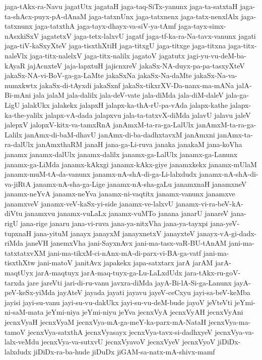 {jaga-tAkx-ra-Navu
jagatUtx
jagataH
jaga-taq-SiTx-yanunx
jaga-ta-satxtaH
jaga-ta-shAcx-puyx-pA-dAnaM
jaga-tatxnUnx
jaga-tatxnenx
jaga-tatx-nenxlAlx
jaga-tatxnunx
jaga-tatxthA
jaga-tayx-dhayx-va-siV-ya-tAmf
jaga-tayx-simx-nAsxkiSxV
jagatetxV
jaga-tetx-lalxvU
jagatf
jaga-tf-ka-ra-Na-tavx-vanunx
jagati
jaga-tiV-kaSxyXteV
jaga-tisxthXtiH
jaga-titxgU
jaga-titxge
jaga-titxna
jaga-titx-naleVlx
jaga-titx-nalelxV
jaga-titx-nalilx
jagatoV
jagatutx
jagi-yu-vu-deM-ba-kAyaR
jajAcnxteV
jaja-lapxtuH
jajicnxreV
jakaSx-NA-duyx-pa-pa-tasxyXteV
jakaSx-NA-vi-BoV-ga-ga-LaMte
jakaSxNa
jakaSx-Na-daMte
jakaSx-Na-va-numxkwtx
jakaSx-di-tAyxdi
jakaSxnf
jakaSx-tikxrXV-Da-nanx-ma-mANa
jalA-Bi-mAni
jala
jalaM
jala-dalilx
jala-deV-vate
jala-diMda
jala-diM-daleV
jala-ga-LigU
jalakUkx
jalakekx
jalapxH
jalapx-ka-thA-rU-pa-vAda
jalapx-kathe
jalapx-ka-the-yalilx
jalapx-vA-dada
jalapxvu
jala-ta-tatxvX-diMda
jalavU
jalavu
jaleV
jalepxV
jalopxV-kitx-va-tamxRnA
janAmxM-ta-ra-ga-LalUlx
janAmxM-ta-ra-ga-Lalilx
janAmx-di-baM-dhavU
janAmx-di-ba-dadhxtavxM
janAmxni
janAmx-ta-ra-dalUlx
janAmxthaRM
janaH
jana-ga-Li-ruva
janaka
janakaM
jana-koVha
janamx
janamx-dalUlx
janamx-dalilx
janamx-ga-LalUlx
janamx-ga-Lanunx
janamx-ga-LiMda
janamx-kAkxgi
janamx-kAkx-giye
janamxkekx
janamx-mUlaM
janamx-muM-tA-da-vanunx
janamx-nA-shA-di-ga-Li-lalxdudx
janamx-nA-shA-di-va-jiRtA
janamx-nA-sha-ga-Lige
janamx-nA-sha-gaLu
janamxnaH
janamxneV
janamx-neYvA
janamx-neYva
janamx-ni-vaqtitx
janamx-vanunx
janamxve
janamxveV
janamx-veV-kaSx-yi-side
janamx-ve-lalxvU
janamx-vi-ra-beV-kA-diVtu
janamxvu
janamx-vuLaLx
janamx-vuMTo
janana
janarU
janareV
jana-rigU
jana-rige
janaru
jana-vi-ruva
jana-ya-nitxVha
jana-ya-tayxpi
jana-yeV-tupxnaH
jana-yituM
janayx
janayxM
janayxnetxV
janayxteV
janayx-vA-gi-dadx-riMda
janeVH
janemxVha
jani-SayxnAvx
jani-ma-tasx-vaR-BU-tAnAM
jani-ma-tatxtatxvXM
jani-ma-tikxM-ci-nAnx-mA-di-parx-vi-BA-ga-vatf
jani-ma-tisxthXtw
jani-matoV
janitAvx
japakekx
japa-satxtarx
jarA
jarAM
jarA-maqtUyx
jarA-maqtuyx
jarA-maq-tuyx-ga-Lu-LaLxdUdx
jara-tAkx-ru-goV-tarxda
jare
jareVti
jari-di-ru-vanu
javxra-diMda
jayA-Bi-lA-Si-ga-Lanunx
jayA-peV-keSx-yiMda
jayAteV
jayada
jayati
jayavu
jayeV-ceCxyu
jayi-sa-beV-keMba
jayisi
jayi-su-vanu
jayi-su-vu-dakUkx
jayi-su-vu-deM-bude
jayoV
jeVteVti
jeYmi-ni-saM-mata
jeYmi-niya
jeYmi-niyu
jeYva
jecnxVyA
jecnxVyAH
jecnxVyAni
jecnxVyaH
jecnxVyaM
jecnxVya-mA-ga-meY-ka-parx-mA-NataH
jecnxVya-ma-tamoV
jecnxVya-satxthA
jecnxVyasayx
jecnxVya-tavx-si-dadhxyeV
jecnxVya-va-lalx-veMdu
jecnxVya-va-sutxvU
jecnxVyavoV
jecnxVyeV
jecnxVyoV
jiDiDx-lalxdudx
jiDiDx-ra-ba-hude
jiDuDx
jiGAM-sa-natx-mA-shivx-mamf
}
